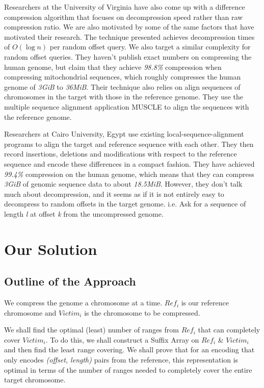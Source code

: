 \documentclass[11pt]{article}
\begin{document}
Researchers at the University of Virginia\cite{vtechresearch} have
also come up with a difference compression algorithm that focuses on
decompression speed rather than raw compression ratio. We are also
motivated by some of the same factors that have motivated their
research. The technique presented achieves decompression times of
$O(\log{n})$ per random offset query. We also target a similar
complexity for random offset queries. They haven't publish exact
numbers on compressing the human genome, but claim that they achieve
\textit{98.8\%} compression when compressing mitochondrial sequences,
which roughly compresses the human genome of \textit{3GiB} to
\textit{36MiB}. Their technique also relies on align sequences of
chromosomes in the target with those in the reference genome. They use
the multiple sequence alignment application MUSCLE\cite{muscle} to
align the sequences with the reference genome.

Researchers at Cairo University, Egypt\cite{cairo} use existing
local-sequence-alignment programs to align the target and reference
sequence with each other. They then record insertions, deletions and
modifications with respect to the reference sequence and encode these
differences in a compact fashion. They have achieved \textit{99.4\%}
compression on the human genome, which means that they can compress
\textit{3GiB} of genomic sequence data to about
\textit{18.5MiB}. However, they don't talk much about decompression,
and it seems as if it is not entirely easy to decompress to random
offsets in the target genome. i.e. Ask for a sequence of length
\textit{l} at offset \textit{k} from the uncompressed genome.

\section{Our Solution}

\subsection{Outline of the Approach}

We compress the genome a chromosome at a time. $Ref_i$ is our
reference chromosome and $Victim_i$ is the chromosome to be
compressed.

We shall find the optimal (least) number of ranges from $Ref_i$ that
can completely cover $Victim_i$. To do this, we shall construct a
Suffix Array on $Ref_i$ \& $Victim_i$ and then find the least range
covering. We shall prove that for an encoding that only encodes
\textit{(offset, length)} pairs from the reference, this
representation is optimal in terms of the number of ranges needed to
completely cover the entire target chromosome.
\end{document}

